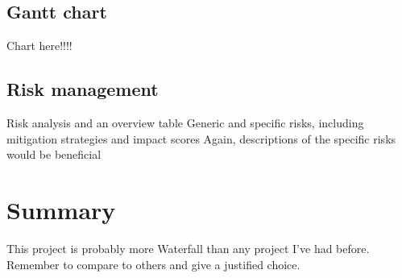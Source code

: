 \documentclass[a4paper,10pt]{article}
\begin{document}
\begin{landscape}
\subsection{Gantt chart}
	Chart here!!!!
\end{landscape}


\subsection{Risk management}
Risk analysis and an overview table
Generic and specific risks, including mitigation strategies and impact scores
Again, descriptions of the specific risks would be beneficial

\section{Summary}



This project is probably more Waterfall than any project I've had before. Remember to compare to others and give a justified choice.

%	

	
	
	
\end{document}
